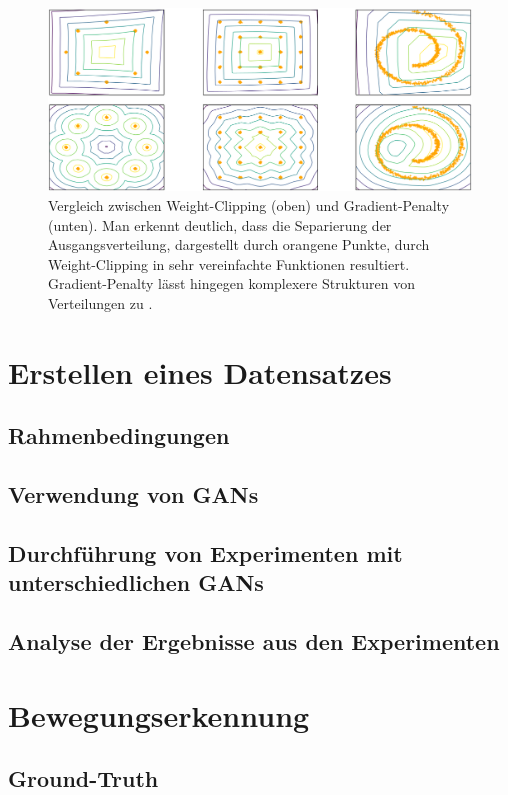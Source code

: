 \documentclass{hsflensburg}
\begin{document}
  \begin{figure}
    \centering
    \includegraphics[width=\textwidth]{images/problems_of_weight_clipping}
    \caption{Vergleich zwischen Weight-Clipping (oben) und Gradient-Penalty
    (unten). Man erkennt deutlich, dass die Separierung der Ausgangsverteilung,
    dargestellt durch orangene Punkte, durch Weight-Clipping in sehr
    vereinfachte Funktionen resultiert. Gradient-Penalty lässt hingegen
    komplexere Strukturen von Verteilungen zu \cite{gulrajani2017improved}.}
    \label{fig:problems-of-weight-clipping}
  \end{figure}

  \chapter{Erstellen eines Datensatzes}
  \section{Rahmenbedingungen}
  \section{Verwendung von GANs}
  \section{Durchführung von Experimenten mit unterschiedlichen GANs}
  \section{Analyse der Ergebnisse aus den Experimenten}

  \chapter{Bewegungserkennung}
  \section{Ground-Truth}
\end{document}
